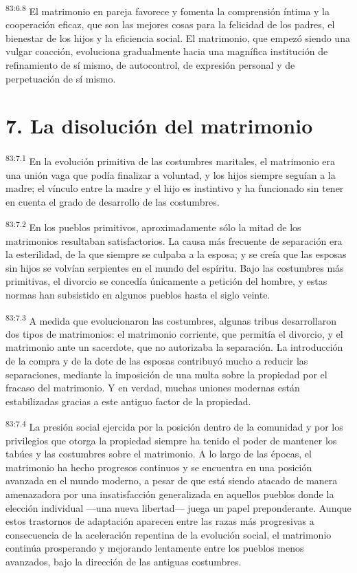 \par
\textsuperscript{83:6.8} El matrimonio en pareja favorece y fomenta la comprensión íntima y la cooperación eficaz, que son las mejores cosas para la felicidad de los padres, el bienestar de los hijos y la eficiencia social. El matrimonio, que empezó siendo una vulgar coacción, evoluciona gradualmente hacia una magnífica institución de refinamiento de sí mismo, de autocontrol, de expresión personal y de perpetuación de sí mismo.

\section*{7. La disolución del matrimonio}
\par
\textsuperscript{83:7.1} En la evolución primitiva de las costumbres maritales, el matrimonio era una unión vaga que podía finalizar a voluntad, y los hijos siempre seguían a la madre; el vínculo entre la madre y el hijo es instintivo y ha funcionado sin tener en cuenta el grado de desarrollo de las costumbres.

\par
\textsuperscript{83:7.2} En los pueblos primitivos, aproximadamente sólo la mitad de los matrimonios resultaban satisfactorios. La causa más frecuente de separación era la esterilidad, de la que siempre se culpaba a la esposa; y se creía que las esposas sin hijos se volvían serpientes en el mundo del espíritu. Bajo las costumbres más primitivas, el divorcio se concedía únicamente a petición del hombre, y estas normas han subsistido en algunos pueblos hasta el siglo veinte.

\par
\textsuperscript{83:7.3} A medida que evolucionaron las costumbres, algunas tribus desarrollaron dos tipos de matrimonios: el matrimonio corriente, que permitía el divorcio, y el matrimonio ante un sacerdote, que no autorizaba la separación. La introducción de la compra y de la dote de las esposas contribuyó mucho a reducir las separaciones, mediante la imposición de una multa sobre la propiedad por el fracaso del matrimonio. Y en verdad, muchas uniones modernas están estabilizadas gracias a este antiguo factor de la propiedad.

\par
\textsuperscript{83:7.4} La presión social ejercida por la posición dentro de la comunidad y por los privilegios que otorga la propiedad siempre ha tenido el poder de mantener los tabúes y las costumbres sobre el matrimonio. A lo largo de las épocas, el matrimonio ha hecho progresos continuos y se encuentra en una posición avanzada en el mundo moderno, a pesar de que está siendo atacado de manera amenazadora por una insatisfacción generalizada en aquellos pueblos donde la elección individual ---una nueva libertad--- juega un papel preponderante. Aunque estos trastornos de adaptación aparecen entre las razas más progresivas a consecuencia de la aceleración repentina de la evolución social, el matrimonio continúa prosperando y mejorando lentamente entre los pueblos menos avanzados, bajo la dirección de las antiguas costumbres.

